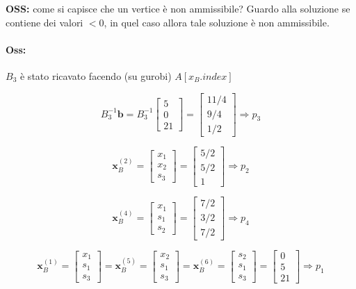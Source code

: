 \documentclass[a4paper, 11pt]{article}
\begin{document}
            

        \textbf{OSS: } come si capisce che un vertice è non ammissibile? Guardo alla soluzione se contiene dei valori $< 0$, in quel caso allora tale soluzione è non ammissibile.

        \paragraph{Oss: } $B_3$ è stato ricavato facendo (su gurobi) $A[x_B.index]$
        
        
        
        \[
            B_3^{-1} \mathbf{b} =
            B_3^{-1}
            \begin{bmatrix}
                5 \\ 0 \\ 21
            \end{bmatrix}
            =
            \begin{bmatrix}
                11/4 \\
                9/4 \\
                1/2
            \end{bmatrix}
            \Rightarrow p_3
        \]


        \[
            \mathbf{x}_B^{(2)} = \begin{bmatrix} x_1 \\ x_2 \\ s_3 \end{bmatrix} = \begin{bmatrix} 5/2 \\ 5/2 \\ 1 \end{bmatrix} \Rightarrow p_2
        \]


        \[
            \mathbf{x}_B^{(4)} = \begin{bmatrix} x_1 \\ s_1 \\ s_2 \end{bmatrix} = \begin{bmatrix} 7/2 \\ 3/2 \\ 7/2 \end{bmatrix} \Rightarrow p_4
        \]

        
        \[
            \mathbf{x}_B^{(1)} = \begin{bmatrix} x_1 \\ s_1 \\ s_3 \end{bmatrix} = \mathbf{x}_B^{(5)} = \begin{bmatrix} x_2 \\ s_1 \\ s_3 \end{bmatrix} = \mathbf{x}_B^{(6)} = \begin{bmatrix} s_2 \\ s_1 \\ s_3 \end{bmatrix} = \begin{bmatrix} 0 \\ 5 \\ 21 \end{bmatrix} \Rightarrow p_1
        \]
\end{document}
